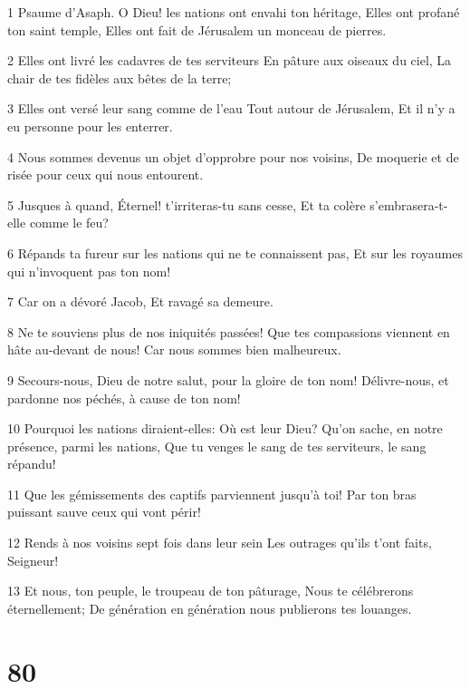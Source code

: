 \par 1 Psaume d'Asaph. O Dieu! les nations ont envahi ton héritage, Elles ont profané ton saint temple, Elles ont fait de Jérusalem un monceau de pierres.
\par 2 Elles ont livré les cadavres de tes serviteurs En pâture aux oiseaux du ciel, La chair de tes fidèles aux bêtes de la terre;
\par 3 Elles ont versé leur sang comme de l'eau Tout autour de Jérusalem, Et il n'y a eu personne pour les enterrer.
\par 4 Nous sommes devenus un objet d'opprobre pour nos voisins, De moquerie et de risée pour ceux qui nous entourent.
\par 5 Jusques à quand, Éternel! t'irriteras-tu sans cesse, Et ta colère s'embrasera-t-elle comme le feu?
\par 6 Répands ta fureur sur les nations qui ne te connaissent pas, Et sur les royaumes qui n'invoquent pas ton nom!
\par 7 Car on a dévoré Jacob, Et ravagé sa demeure.
\par 8 Ne te souviens plus de nos iniquités passées! Que tes compassions viennent en hâte au-devant de nous! Car nous sommes bien malheureux.
\par 9 Secours-nous, Dieu de notre salut, pour la gloire de ton nom! Délivre-nous, et pardonne nos péchés, à cause de ton nom!
\par 10 Pourquoi les nations diraient-elles: Où est leur Dieu? Qu'on sache, en notre présence, parmi les nations, Que tu venges le sang de tes serviteurs, le sang répandu!
\par 11 Que les gémissements des captifs parviennent jusqu'à toi! Par ton bras puissant sauve ceux qui vont périr!
\par 12 Rends à nos voisins sept fois dans leur sein Les outrages qu'ils t'ont faits, Seigneur!
\par 13 Et nous, ton peuple, le troupeau de ton pâturage, Nous te célébrerons éternellement; De génération en génération nous publierons tes louanges.

\chapter{80}

